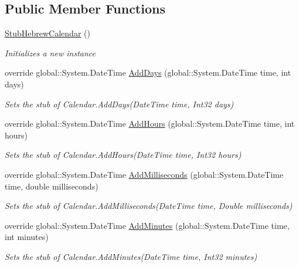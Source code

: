 \subsection*{Public Member Functions}
\begin{DoxyCompactItemize}
\item 
\hyperlink{class_system_1_1_globalization_1_1_fakes_1_1_stub_hebrew_calendar_a9dda8529cfdfabbc1b219f5164e3ae9c}{Stub\-Hebrew\-Calendar} ()
\begin{DoxyCompactList}\small\item\em Initializes a new instance\end{DoxyCompactList}\item 
override global\-::\-System.\-Date\-Time \hyperlink{class_system_1_1_globalization_1_1_fakes_1_1_stub_hebrew_calendar_a864227d76082b48a5fa07418e64c579d}{Add\-Days} (global\-::\-System.\-Date\-Time time, int days)
\begin{DoxyCompactList}\small\item\em Sets the stub of Calendar.\-Add\-Days(\-Date\-Time time, Int32 days)\end{DoxyCompactList}\item 
override global\-::\-System.\-Date\-Time \hyperlink{class_system_1_1_globalization_1_1_fakes_1_1_stub_hebrew_calendar_a216b0647387b7bb67b666f7cb1e84f3e}{Add\-Hours} (global\-::\-System.\-Date\-Time time, int hours)
\begin{DoxyCompactList}\small\item\em Sets the stub of Calendar.\-Add\-Hours(\-Date\-Time time, Int32 hours)\end{DoxyCompactList}\item 
override global\-::\-System.\-Date\-Time \hyperlink{class_system_1_1_globalization_1_1_fakes_1_1_stub_hebrew_calendar_a5068851da027a7fbd5b76253c44cc50d}{Add\-Milliseconds} (global\-::\-System.\-Date\-Time time, double milliseconds)
\begin{DoxyCompactList}\small\item\em Sets the stub of Calendar.\-Add\-Milliseconds(\-Date\-Time time, Double milliseconds)\end{DoxyCompactList}\item 
override global\-::\-System.\-Date\-Time \hyperlink{class_system_1_1_globalization_1_1_fakes_1_1_stub_hebrew_calendar_ac14ea7fa581a131f3c88e99cd36df34d}{Add\-Minutes} (global\-::\-System.\-Date\-Time time, int minutes)
\begin{DoxyCompactList}\small\item\em Sets the stub of Calendar.\-Add\-Minutes(\-Date\-Time time, Int32 minutes)\end{DoxyCompactList}\item 

\end{DoxyCompactItemize}
